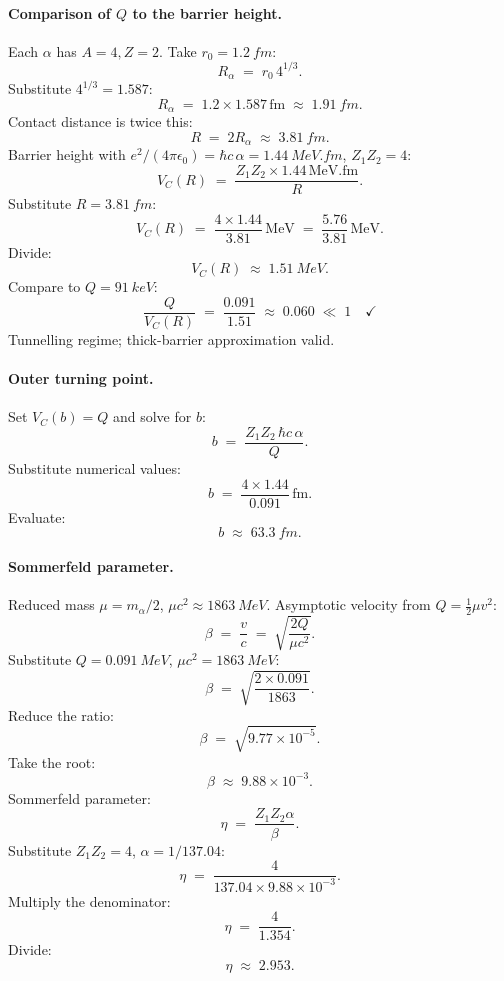 \documentclass[11pt]{article}
\begin{document}
\paragraph{Comparison of $Q$ to the barrier height.} Each $\alpha$ has $A=4,Z=2$. Take $r_{0}=\SI{1.2}{fm}$:
\[
R_{\alpha}\;=\;r_{0}\,4^{1/3}.
\]
Substitute $4^{1/3}=1.587$:
\[
R_{\alpha}\;=\;1.2\times 1.587\,\text{fm}\;\approx\;\SI{1.91}{fm}.
\]
Contact distance is twice this:
\[
R\;=\;2R_{\alpha}\;\approx\;\SI{3.81}{fm}.
\]
Barrier height with $e^{2}/(4\pi\epsilon_{0})=\hbar c\,\alpha=\SI{1.44}{MeV.fm}$, $Z_{1}Z_{2}=4$:
\[
V_{C}(R)\;=\;\frac{Z_{1}Z_{2}\times 1.44\,\text{MeV.fm}}{R}.
\]
Substitute $R=\SI{3.81}{fm}$:
\[
V_{C}(R)\;=\;\frac{4\times 1.44}{3.81}\,\text{MeV}\;=\;\frac{5.76}{3.81}\,\text{MeV}.
\]
Divide:
\[
V_{C}(R)\;\approx\;\SI{1.51}{MeV}.
\]
Compare to $Q=\SI{91}{keV}$:
\[
\frac{Q}{V_{C}(R)}\;=\;\frac{0.091}{1.51}\;\approx\;0.060\;\ll\;1\quad\checkmark
\]
Tunnelling regime; thick-barrier approximation valid.

\paragraph{Outer turning point.} Set $V_{C}(b)=Q$ and solve for $b$:
\[
b\;=\;\frac{Z_{1}Z_{2}\,\hbar c\,\alpha}{Q}.
\]
Substitute numerical values:
\[
b\;=\;\frac{4\times 1.44}{0.091}\,\text{fm}.
\]
Evaluate:
\[
b\;\approx\;\SI{63.3}{fm}.
\]

\paragraph{Sommerfeld parameter.} Reduced mass $\mu=m_{\alpha}/2$, $\mu c^{2}\approx\SI{1863}{MeV}$. Asymptotic velocity from $Q=\tfrac12\mu v^{2}$:
\[
\beta\;=\;\frac{v}{c}\;=\;\sqrt{\frac{2Q}{\mu c^{2}}}.
\]
Substitute $Q=\SI{0.091}{MeV}$, $\mu c^{2}=\SI{1863}{MeV}$:
\[
\beta\;=\;\sqrt{\frac{2\times 0.091}{1863}}.
\]
Reduce the ratio:
\[
\beta\;=\;\sqrt{9.77\times 10^{-5}}.
\]
Take the root:
\[
\beta\;\approx\;9.88\times 10^{-3}.
\]
Sommerfeld parameter:
\[
\eta\;=\;\frac{Z_{1}Z_{2}\alpha}{\beta}.
\]
Substitute $Z_{1}Z_{2}=4$, $\alpha=1/137.04$:
\[
\eta\;=\;\frac{4}{137.04\times 9.88\times 10^{-3}}.
\]
Multiply the denominator:
\[
\eta\;=\;\frac{4}{1.354}.
\]
Divide:
\[
\eta\;\approx\;2.953.
\]
\end{document}
